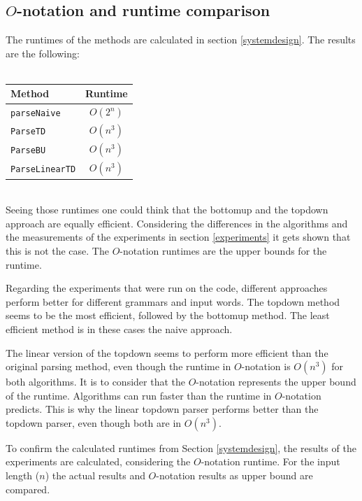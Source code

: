 \documentclass[a4paper, 11pt]{article}
\begin{document}



\subsection{$O$-notation and runtime comparison}
\label{runtime}


The runtimes of the methods are calculated in section \ref{systemdesign}. The results are the following:
\ \\ \\
\begin{tabular}{|l|c|}
\hline
Method & Runtime \\
\hline
\texttt{parseNaive} & $O(2^n)$\\
\texttt{ParseTD} & $O(n^3)$ \\
\texttt{ParseBU} & $O(n^3)$\\
\texttt{ParseLinearTD} & $O(n^3)$\\
\hline
\end{tabular}

\ \\
Seeing those runtimes one could think that the bottomup and the topdown approach are equally efficient. Considering the differences in the algorithms and the measurements of the experiments in section \ref{experiments} it gets shown that this is not the case. The $O$-notation runtimes are the upper bounds for the runtime. 

Regarding the experiments that were run on the code, different approaches perform better for different grammars and input words. The topdown method seems to be the most efficient, followed by the bottomup method. The least efficient method is in these cases the naive approach.

The linear version of the topdown seems to perform more efficient than the original parsing method, even though the runtime in $O$-notation is $O(n^3)$ for both algorithms. 
It is to consider that the $O$-notation represents the upper bound of the runtime. Algorithms can run faster than the runtime in $O$-notation predicts. This is why the linear topdown parser performs better than the topdown parser, even though both are in $O(n^3)$.

To confirm the calculated runtimes from Section \ref{systemdesign}, the results of the experiments are calculated, considering the $O$-notation runtime. For the input length ($n$) the actual results and $O$-notation results as upper bound are compared.
\end{document}
